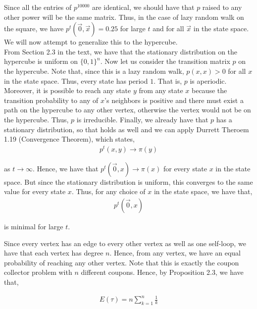\documentclass[12pt]{article}
\newenvironment{problem}[2][Problem]{\begin{trivlist}
\item[\hskip \labelsep {\bfseries #1}\hskip \labelsep {\bfseries #2.}]}{\end{trivlist}}
\begin{document}
Since all the entries of $p^{10000}$ are identical, we should have that $p$ raised to any other power will be the same matrix. Thus, in the case of lazy random walk on the square, we have $p^t(\vec{0}, \vec{x}) = 0.25$ for large $t$ and for all $\vec{x}$ in the state space. We will now attempt to generalize this to the hypercube.\\

From Section 2.3 in the text, we have that the stationary distribution on the hypercube is uniform on $\{0, 1\}^n$.  Now let us consider the transition matrix $p$ on the hypercube. Note that, since this is a lazy random walk, $p(x, x) > 0$ for all $x$ in the state space. Thus, every state has period $1$. That is, $p$ is aperiodic. Moreover, it is possible to reach any state $y$ from any state $x$ because the transition probability to any of $x$'s neighbors is positive and there must exist a path on the hypercube to any other vertex, otherwise the vertex would not be on the hypercube. Thus, $p$ is irreducible. Finally, we already have that $p$ has a stationary distribution, so that holds as well and we can apply Durrett Theroem 1.19 (Convergence Theorem), which states,
\begin{align*}
p^t(x,y) \to \pi(y)
\end{align*}

as $t \to \infty$. Hence, we have that $p^t(\vec{0}, x) \to \pi(x)$ for every state $x$ in the state space. But since the stationary distribution is uniform, this converges to the same value for every state $x$. Thus, for any choice of $x$ in the state space, we have that,
\begin{align*}
p^t(\vec{0}, x)
\end{align*}

is minimal for large $t$.

\begin{problem}{III}
\end{problem}

Since every vertex has an edge to every other vertex as well as one self-loop, we have that each vertex has degree $n$. Hence, from any vertex, we have an equal probability of reaching any other vertex. Note that this is exactly the coupon collector problem with $n$ different coupons. Hence, by Proposition 2.3, we have that,

\begin{align*}
E(\tau) = n \sum_{k=1}^n \frac{1}{k}
\end{align*}
\begin{problem}{IV}
\end{problem}
\end{document}
